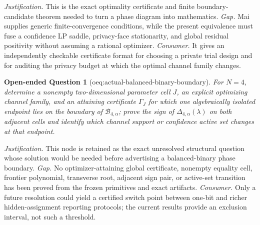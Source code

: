 \documentclass{article}
\newtheorem{openendedquestion}{Open-ended Question}
\begin{document}
\par\smallskip\noindent \textit{Justification.} This is the exact optimality certificate and finite boundary-candidate theorem needed to turn a phase diagram into mathematics. \textit{Gap.} Mai supplies generic finite-convergence conditions, while the present equivalence must fuse a confidence LP saddle, privacy-face stationarity, and global residual positivity without assuming a rational optimizer. \textit{Consumer.} It gives an independently checkable certificate format for choosing a private trial design and for auditing the privacy budget at which the optimal channel family changes.

\begin{openendedquestion}[oeq:actual-balanced-binary-boundary]\label{oeq:actual-balanced-binary-boundary}
For \(N=4\), determine a nonempty two-dimensional parameter cell \(J\), an explicit optimizing channel family, and an attaining certificate \(\Gamma_J\) for which one algebraically isolated endpoint lies on the boundary of \(\mathcal B_{4,\alpha}\); prove the sign of \(\Delta_{4,\alpha}(\lambda)\) on both adjacent cells and identify which channel support or confidence active set changes at that endpoint.
\end{openendedquestion}
\par\smallskip\noindent \textit{Justification.} This node is retained as the exact unresolved structural question whose solution would be needed before advertising a balanced-binary phase boundary. \textit{Gap.} No optimizer-attaining global certificate, nonempty equality cell, frontier polynomial, transverse root, adjacent sign pair, or active-set transition has been proved from the frozen primitives and exact artifacts. \textit{Consumer.} Only a future resolution could yield a certified switch point between one-bit and richer hidden-assignment reporting protocols; the current results provide an exclusion interval, not such a threshold.
\end{document}
